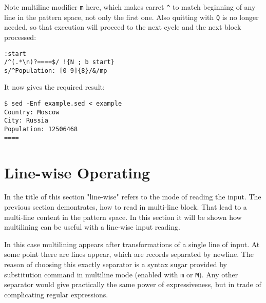 Note multiline modifier \lstinline{m} here, which makes carret
\lstinline{^} to match beginning of any line in the pattern space, not
only the first one.
Also quitting with \lstinline{Q} is no longer needed, so that
execution will proceed to the next cycle
and the next block processed:
\begin{lstlisting}
:start
/^(.*\n)?====$/ !{N ; b start}
s/^Population: [0-9]{8}/&/mp
\end{lstlisting}

It now gives the required result:
\begin{lstlisting}
$ sed -Enf example.sed < example
Country: Moscow
City: Russia
Population: 12506468
====
\end{lstlisting}
\section{Line-wise Operating}
In the title of this section "line-wise" refers to the mode of reading the input.
The previous section demontrates, how to read in multi-line block. That lead to
a multi-line content in the pattern space. In this section it will be shown how
multilining can be useful with a line-wise input reading.

In this case multilining appears after transformations of a single line of input.
At some point there are lines appear, which are records separated by newline.
The reason of choosing this exactly separator is a syntax sugar provided by
substitution command in multiline mode (enabled with \lstinline{m} or
\lstinline{M}). Any other separator would give practically the same power of
expressiveness, but in trade of complicating regular expressions.
